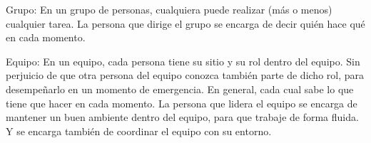 Grupo:
En un grupo de personas, cualquiera puede realizar (más o menos) cualquier tarea.
La persona que dirige el grupo se encarga de decir quién hace qué en cada momento. 

Equipo:
En un equipo, cada persona tiene su sitio y su rol dentro del equipo. Sin perjuicio de que otra persona del equipo conozca también parte de dicho rol, para desempeñarlo en un momento de emergencia. En general, cada cual sabe lo que tiene que hacer en cada momento.
La persona que lidera el equipo se encarga de mantener un buen ambiente dentro del equipo, para que trabaje de forma fluida. Y se encarga también de coordinar el equipo con su entorno.
